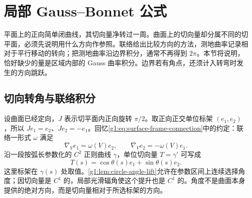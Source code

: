 
% 
% 

\section{局部 Gauss–Bonnet 公式}
\label{g1:sec:0903}

平面上的正向简单闭曲线，其切向量净转过一周。曲面上的切向量却分属不同的切平面，必须先说明用什么方向作参照。联络给出比较方向的方法，测地曲率记录相对于平行移动的转向；把测地曲率沿边界积分，通常不再得到 \(2\pi\)。本节将说明，恰好缺少的量是区域内部的 Gauss 曲率积分。边界若有角点，还须计入转弯时发生的方向跳跃。

\subsection{切向转角与联络积分}
\label{g1:subsec:0903:01}

设曲面已经定向，\(J\) 表示切平面内正向旋转 \(\pi/2\)。取正向正交单位标架 \((e_1,e_2)\)，所以 \(Je_1=e_2\)、\(Je_2=-e_1\)。回忆\eqref{g1:eq:surface-frame-connection}中的约定：联络一形式 \(\omega\) 满足
\[
	\nabla_Ve_1=\omega(V)e_2,\qquad \nabla_Ve_2=-\omega(V)e_1.
\]
沿一段按弧长参数化的 \(C^2\) 正则曲线 \(\gamma\)，单位切向量 \(T=\gamma'\) 可写成
\[
	T(s)=\cos\theta(s)e_1+\sin\theta(s)e_2.
\]
这里标架在 \(\gamma(s)\) 处取值。\cref{g1:lem:circle-angle-lift}允许在参数区间上连续选择角度；因切向量是 \(C^1\) 的，局部光滑辐角使这个提升也是 \(C^1\) 的。角度不是曲面本身提供的绝对方向，而是切向量相对于所选标架的方向。

